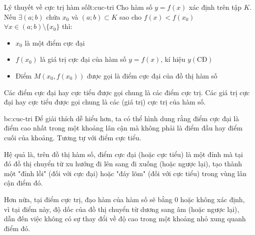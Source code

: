 \begin{lythuyetbox}{Lý thuyết về cực trị hàm số}{lt:cuc-tri}
Cho hàm số $y = f(x)$ xác định trên tập $K$.
Nếu $\exists (a;b)$ chứa $x_0$ và $(a;b) \subset K$ sao cho $f(x) < f(x_0)$ $\forall x \in (a;b) \setminus \{x_0\}$ thì:
\begin{itemize}
    \item $x_0$ là một điểm cực đại
    \item $f(x_0)$ là giá trị cực đại của hàm số $y = f(x)$, kí hiệu $y(\mathrm{CĐ})$
    \item Điểm $M(x_0, f(x_0))$ được gọi là điểm cực đại của đồ thị hàm số
\end{itemize}
Các điểm cực đại hay cực tiểu được gọi chung là các điểm cực trị. Các giá trị cực đại hay cực tiểu được gọi chung là các (giá trị) cực trị của hàm số.

\vspace{1.5em} %

\begin{banchat}{}{bc:cuc-tri}
Để giải thích dễ hiểu hơn, ta có thể hình dung rằng điểm cực đại là điểm cao nhất trong một khoảng lân cận mà không phải là điểm đầu hay điểm cuối của khoảng. Tương tự với điểm cực tiểu.

\vspace{1.5em}

Hệ quả là, trên đồ thị hàm số, điểm cực đại (hoặc cực tiểu) là một đỉnh mà tại đó đồ thị chuyển từ xu hướng đi lên sang đi xuống (hoặc ngược lại), tạo thành một "đỉnh lồi" (đối với cực đại) hoặc "đáy lõm" (đối với cực tiểu) trong vùng lân cận điểm đó.

\vspace{1.5em}

Hơn nữa, tại điểm cực trị, đạo hàm của hàm số sẽ bằng 0 hoặc không xác định, vì tại điểm này, độ dốc của đồ thị chuyển từ dương sang âm (hoặc ngược lại), dẫn đến việc không có sự thay đổi về độ cao trong một khoảng nhỏ xung quanh điểm đó.


\end{banchat}
\end{lythuyetbox}
